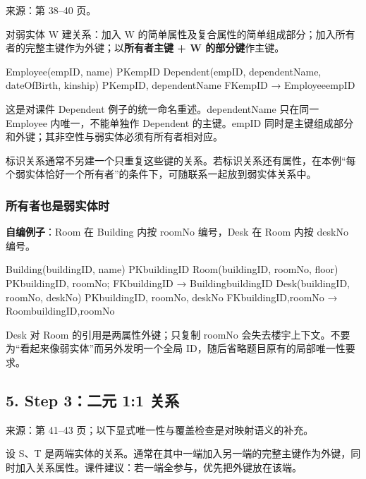 来源：第 38--40 页。

对弱实体 W 建关系：加入 W 的简单属性及复合属性的简单组成部分；加入所有者的完整主键作为外键；以\textbf{所有者主键 + W 的部分键}作主键。

\begin{StudyCode}
Employee(empID, name)                       PK{empID}
Dependent(empID, dependentName, dateOfBirth, kinship)
  PK{empID, dependentName}
  FK{empID} → Employee{empID}
\end{StudyCode}

这是对课件 Dependent 例子的统一命名重述。dependentName 只在同一 Employee 内唯一，不能单独作 Dependent 的主键。empID 同时是主键组成部分和外键；其非空性与弱实体必须有所有者相对应。

标识关系通常不另建一个只重复这些键的关系。若标识关系还有属性，在本例``每个弱实体恰好一个所有者''的条件下，可随联系一起放到弱实体关系中。

\subsubsection{所有者也是弱实体时}\label{04_er_to_relational_mapping_zh-ux6240ux6709ux8005ux4e5fux662fux5f31ux5b9eux4f53ux65f6}

\textbf{自编例子}：Room 在 Building 内按 roomNo 编号，Desk 在 Room 内按 deskNo 编号。

\begin{StudyCode}
Building(buildingID, name)                 PK{buildingID}
Room(buildingID, roomNo, floor)
  PK{buildingID, roomNo}; FK{buildingID} → Building{buildingID}
Desk(buildingID, roomNo, deskNo)
  PK{buildingID, roomNo, deskNo}
  FK{buildingID,roomNo} → Room{buildingID,roomNo}
\end{StudyCode}

Desk 对 Room 的引用是两属性外键；只复制 roomNo 会失去楼宇上下文。不要为``看起来像弱实体''而另外发明一个全局 ID，随后省略题目原有的局部唯一性要求。

\subsection{5. Step 3：二元 1:1 关系}\label{04_er_to_relational_mapping_zh-step-3ux4e8cux5143-11-ux5173ux7cfb}

来源：第 41--43 页；以下显式唯一性与覆盖检查是对映射语义的补充。

设 S、T 是两端实体的关系。通常在其中一端加入另一端的完整主键作为外键，同时加入关系属性。课件建议：若一端全参与，优先把外键放在该端。

